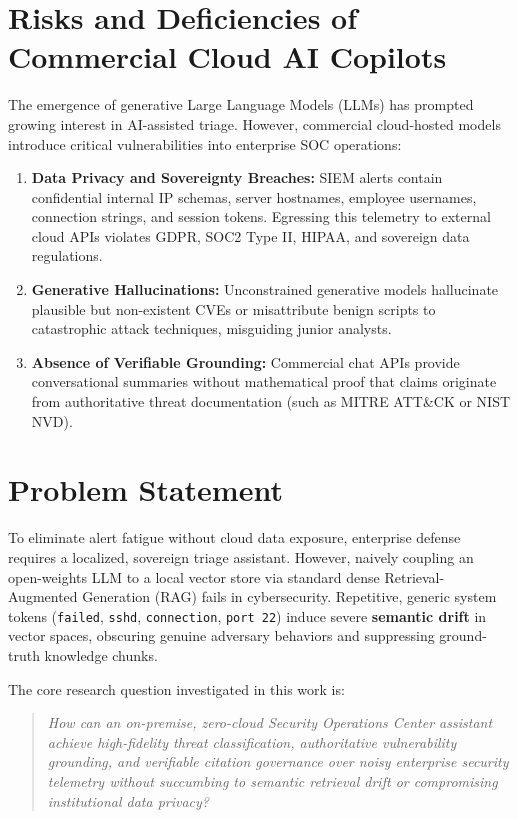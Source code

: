 \section{Risks and Deficiencies of Commercial Cloud AI Copilots}
\label{sec:cloud_ai_risks}
The emergence of generative Large Language Models (LLMs) has prompted growing interest in AI-assisted triage. However, commercial cloud-hosted models introduce critical vulnerabilities into enterprise SOC operations:
\begin{enumerate}
  \item \textbf{Data Privacy and Sovereignty Breaches:} SIEM alerts contain confidential internal IP schemas, server hostnames, employee usernames, connection strings, and session tokens. Egressing this telemetry to external cloud APIs violates GDPR, SOC2 Type II, HIPAA, and sovereign data regulations.
  \item \textbf{Generative Hallucinations:} Unconstrained generative models hallucinate plausible but non-existent CVEs or misattribute benign scripts to catastrophic attack techniques, misguiding junior analysts.
  \item \textbf{Absence of Verifiable Grounding:} Commercial chat APIs provide conversational summaries without mathematical proof that claims originate from authoritative threat documentation (such as MITRE ATT\&CK or NIST NVD).
\end{enumerate}

\section{Problem Statement}
\label{sec:problem_statement}
To eliminate alert fatigue without cloud data exposure, enterprise defense requires a localized, sovereign triage assistant. However, naively coupling an open-weights LLM to a local vector store via standard dense Retrieval-Augmented Generation (RAG) fails in cybersecurity. Repetitive, generic system tokens (\texttt{failed}, \texttt{sshd}, \texttt{connection}, \texttt{port 22}) induce severe \textbf{semantic drift} in vector spaces, obscuring genuine adversary behaviors and suppressing ground-truth knowledge chunks.

The core research question investigated in this work is:
\begin{quote}
\itshape
How can an on-premise, zero-cloud Security Operations Center assistant achieve high-fidelity threat classification, authoritative vulnerability grounding, and verifiable citation governance over noisy enterprise security telemetry without succumbing to semantic retrieval drift or compromising institutional data privacy?
\end{quote}

